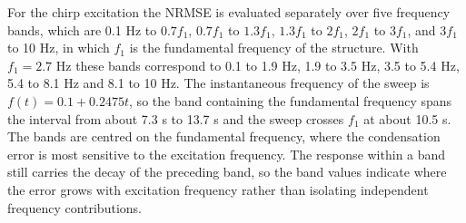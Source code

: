 \documentclass[11pt,a4paper]{article}
\numberwithin{equation}{section}
\begin{document}
For the chirp excitation the NRMSE is evaluated separately over five frequency bands, which are 0.1 Hz to \(0.7f_{1}\), \(0.7f_{1}\) to \(1.3f_{1}\), \(1.3f_{1}\) to \(2f_{1}\), \(2f_{1}\) to \(3f_{1}\), and \(3f_{1}\) to 10 Hz, in which \(f_{1}\) is the fundamental frequency of the structure. With \(f_{1}=2.7\) Hz these bands correspond to 0.1 to 1.9 Hz, 1.9 to 3.5 Hz, 3.5 to 5.4 Hz, 5.4 to 8.1 Hz and 8.1 to 10 Hz. The instantaneous frequency of the sweep is \(f(t)=0.1+0.2475t\), so the band containing the fundamental frequency spans the interval from about 7.3 s to 13.7 s and the sweep crosses \(f_{1}\) at about 10.5 s. The bands are centred on the fundamental frequency, where the condensation error is most sensitive to the excitation frequency. The response within a band still carries the decay of the preceding band, so the band values indicate where the error grows with excitation frequency rather than isolating independent frequency contributions.
\end{document}
